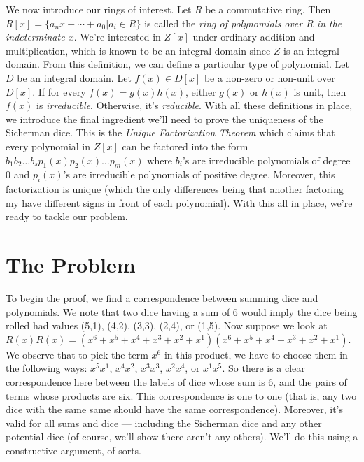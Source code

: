 \documentclass[12pt]{report}
\begin{document}
We now introduce our rings of interest. Let $R$ be a commutative ring. Then
$R[x]=\{ a_{n}x + \cdots + a_{0} | a_{i}\in R\}$ is called the \textit{ring of polynomials over $R$ in the
indeterminate $x$}. We're interested in $Z[x]$ under ordinary addition and multiplication, which is known to
be an integral domain since $Z$ is an integral domain. From this definition, we can define a particular type
of polynomial. Let $D$ be an integral domain. Let $f(x)\in D[x]$ be a non-zero or non-unit over $D[x]$. If for
every $f(x)=g(x)h(x)$, either $g(x)$ or $h(x)$ is unit, then $f(x)$ is \textit{irreducible}. Otherwise, it's
\textit{reducible}. With all these definitions in place, we introduce the final ingredient we'll need to prove
the uniqueness of the Sicherman dice. This is the \textit{Unique Factorization Theorem} which claims that
every polynomial in $Z[x]$ can be factored into the form
$b_{1}b_{2}\ldots b_{s}p_{1}(x)p_{2}(x)\ldots p_{m}(x)$ where $b_{i}$'s are irreducible polynomials of degree
$0$ and $p_{i}(x)$'s are irreducible polynomials of positive degree. Moreover, this factorization is unique
(which the only differences being that another factoring my have different signs in front of each polynomial).
With this all in place, we're ready to tackle our problem.

\section*{The Problem}
To begin the proof, we find a correspondence between summing dice and polynomials. We note that two dice
having a sum of 6 would imply the dice being rolled had values (5,1), (4,2), (3,3), (2,4), or (1,5). Now
suppose we look at $R(x)R(x)=(x^{6}+x^{5}+x^{4}+x^{3}+x^{2}+x^{1})(x^{6}+x^{5}+x^{4}+x^{3}+x^{2}+x^{1})$. We
observe that to pick the term $x^{6}$ in this product, we have to choose them in the following ways:
$x^{5}x^{1}$, $x^{4}x^{2}$, $x^{3}x^{3}$, $x^{2}x^{4}$, or $x^{1}x^{5}$. So there is a clear correspondence
here between the labels of dice whose sum is 6, and the pairs of terms whose products are six. This
correspondence is one to one (that is, any two dice with the same same should have the same correspondence).
Moreover, it's valid for all sums and dice --- including the Sicherman dice and any other potential dice (of
course, we'll show there aren't any others). We'll do this using a constructive argument, of sorts.
\end{document}
